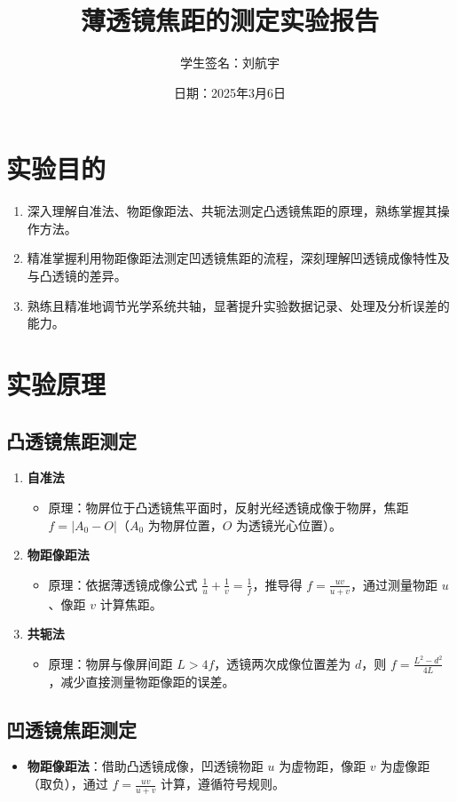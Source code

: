 \documentclass[12pt,a4paper]{article}
\title{薄透镜焦距的测定实验报告}
\author{学生签名：刘航宇}
\date{日期：2025年3月6日}
\begin{document}
\maketitle

\section{实验目的}
\begin{enumerate}
\item 深入理解自准法、物距像距法、共轭法测定凸透镜焦距的原理，熟练掌握其操作方法。
\item 精准掌握利用物距像距法测定凹透镜焦距的流程，深刻理解凹透镜成像特性及与凸透镜的差异。
\item 熟练且精准地调节光学系统共轴，显著提升实验数据记录、处理及分析误差的能力。
\end{enumerate}

\section{实验原理}

\subsection{凸透镜焦距测定}
\begin{enumerate}
\item \textbf{自准法}
\begin{itemize}
\item 原理：物屏位于凸透镜焦平面时，反射光经透镜成像于物屏，焦距 $f = |A_0 - O|$（$A_0$ 为物屏位置，$O$ 为透镜光心位置）。
\end{itemize}

\item \textbf{物距像距法}
\begin{itemize}
\item 原理：依据薄透镜成像公式 $\frac{1}{u} + \frac{1}{v} = \frac{1}{f}$，推导得 $f = \frac{uv}{u + v}$，通过测量物距 $u$、像距 $v$ 计算焦距。
\end{itemize}

\item \textbf{共轭法}
\begin{itemize}
\item 原理：物屏与像屏间距 $L > 4f$，透镜两次成像位置差为 $d$，则 $f = \frac{L^2 - d^2}{4L}$，减少直接测量物距像距的误差。
\end{itemize}
\end{enumerate}

\subsection{凹透镜焦距测定}
\begin{itemize}
\item \textbf{物距像距法}：借助凸透镜成像，凹透镜物距 $u$ 为虚物距，像距 $v$ 为虚像距（取负），通过 $f = \frac{uv}{u + v}$ 计算，遵循符号规则。
\end{itemize}
\end{document}
